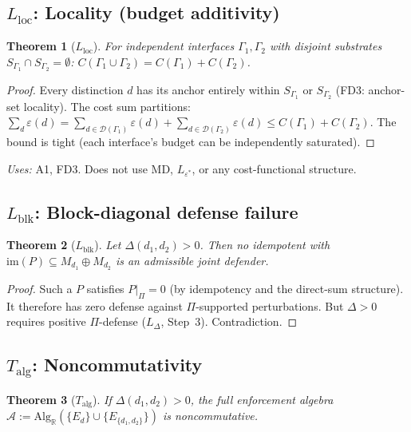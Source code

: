 \documentclass[11pt,a4paper]{article}
\newtheorem{theorem_app}{Theorem}[section]
\theoremstyle{definition}
\begin{document}
\subsection{$L_{\mathrm{loc}}$: Locality (budget additivity)}
\label{app:Lloc}

\begin{theorem_app}[$L_{\mathrm{loc}}$]
For independent interfaces $\Gamma_1, \Gamma_2$ with disjoint
substrates $S_{\Gamma_1} \cap S_{\Gamma_2} = \emptyset$:
$C(\Gamma_1 \cup \Gamma_2) = C(\Gamma_1) + C(\Gamma_2)$.
\end{theorem_app}

\begin{proof}
Every distinction $d$ has its anchor entirely within $S_{\Gamma_1}$ or
$S_{\Gamma_2}$ (FD3: anchor-set locality).  The cost sum partitions:
$\sum_d \varepsilon(d) = \sum_{d \in \mathcal{D}(\Gamma_1)}
\varepsilon(d) + \sum_{d \in \mathcal{D}(\Gamma_2)} \varepsilon(d)
\le C(\Gamma_1) + C(\Gamma_2)$.  The bound is tight (each interface's
budget can be independently saturated).
\end{proof}

\noindent\textit{Uses:} A1, FD3.  Does not use MD, $L_{\varepsilon^*}$,
or any cost-functional structure.


\subsection{$L_{\mathrm{blk}}$: Block-diagonal defense failure}
\label{app:Lblk}

\begin{theorem_app}[$L_{\mathrm{blk}}$]
Let $\Delta(d_1,d_2) > 0$.  Then no idempotent with
$\mathrm{im}(P) \subseteq M_{d_1} \oplus M_{d_2}$ is an admissible
joint defender.
\end{theorem_app}

\begin{proof}
Such a $P$ satisfies $P|_\Pi = 0$ (by idempotency and the direct-sum
structure).  It therefore has zero defense against $\Pi$-supported
perturbations.  But $\Delta > 0$ requires positive $\Pi$-defense
($L_\Delta$, Step~3).  Contradiction.
\end{proof}


\subsection{$T_{\mathrm{alg}}$: Noncommutativity}
\label{app:Talg}

\begin{theorem_app}[$T_{\mathrm{alg}}$]
If $\Delta(d_1,d_2) > 0$, the full enforcement algebra
$\mathcal{A} := \mathrm{Alg}_\mathbb{R}(\{E_d\} \cup
\{E_{\{d_1,d_2\}}\})$ is noncommutative.
\end{theorem_app}
\end{document}
